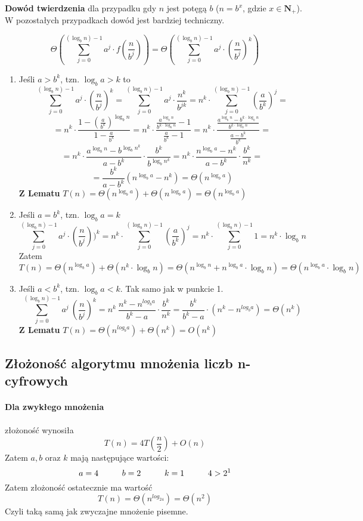 \textbf{Dowód twierdzenia} dla przypadku gdy $n$ jest potęgą $b$ ($n=b^x$, gdzie $x \in \mathbf{N}_+$). W pozostałych przypadkach dowód jest bardziej techniczny.

$$\Theta(\sum_{j=0}^{(\log_b n)-1} a^j \cdot f(\frac{n}{b^j}))=\Theta(\sum_{j=0}^{(\log_b n)-1} a^j\cdot (\frac{n}{b^j})^k)$$

\begin{enumerate}
\item Jeśli $a > b^k$, tzn. $\log_b a > k$ to
	$$ \sum_{j=0}^{(\log_b n)-1} a^j \cdot (\frac{n}{b^j})^k 
	= \sum_{j=0}^{(\log_b n)-1} a^j \cdot \frac{n^k}{b^{jk}}
	= n^k \cdot \sum_{j=0}^{(\log_b n)-1} (\frac{a}{b^k})^j 
	=
	$$
	$$= n^k \cdot \frac{1-(\frac{a}{b^k})^{\log_b n}}{1-\frac{a}{b^k}} 
	= n^k \cdot \frac{\frac{a^{\log_b n}} {b^{k \cdot \log_b n}}-1}{\frac{a}{b^k}-1} 
	= n^k \cdot \frac{\frac{a^{\log_b n} - b^{k \cdot \log_b n}}{b^{k \cdot \log_b n}}}{\frac{a-b^k}{b^k}} 
	=
	$$
	$$
	= n^k \cdot \frac{a^{\log_b n} - b^{\log_b n^k}}{a - b^k} \cdot  \frac{b^k}{b^{\log_b n^k}}
	= n^k \cdot \frac{n^{\log_b a}-n^k}{a - b^k} \cdot \frac{b^k}{n^k} 
	=	
	$$
	$$	
	= \frac{b^k}{a-b^k}(n^{\log_b a}-n^k) 
	= \Theta(n^{\log_b a})$$
	\textbf{Z Lematu} $T(n) = \Theta(n^{\log_b a}) + \Theta(n^{\log_b a}) = \Theta(n^{\log_b a})$
\item Jeśli $a = b^k$, tzn. $\log_b a=k$
	$$	\sum_{j=0}^{(\log_b n)-1} a^j \cdot (\frac{n}{b^j}))^k 
	= n^k \cdot \sum_{j=0}^{(\log_b n)-1} (\frac{a}{b^k})^j 
	= n^k \cdot \sum_{j=0}^{(\log_b n)-1} 1 
	= n^k \cdot \log_b n
	$$
	Zatem 
	$$T(n) = \Theta(n^{\log_b a}) + \Theta(n^k \cdot \log_b n) 
	= \Theta(n^{\log_b n} + n^{\log_b a} \cdot \log_b n) 
	= \Theta(n^{\log_b a} \cdot \log_b n) $$
\item Jeśli $a<b^k$, tzn. $\log_b a<k$. Tak samo jak w punkcie 1.
	$$\sum_{j=0}^{(\log_b n)-1} a^j\ (\frac{n}{b^j})^k = n^k\ \frac{n^k-n^{log_ba}}{b^k-a} \cdot \frac{b^k}{n^k} = \frac{b^k}{b^k-a}\cdot (n^k - n^{log_ba})=\Theta(n^k)$$
	\textbf{Z Lematu} $T(n) = \Theta(n^{log_ba}) + \Theta(n^k) = O(n^k)$
\end{enumerate}

\subsection{Złożoność algorytmu mnożenia liczb n-cyfrowych}
\paragraph{Dla zwykłego mnożenia} złożoność wynosiła
	$$T(n) = 4T(\frac{n}{2}) + O(n)$$
Zatem $a,b$ oraz $k$ mają następujące wartości:
	$$a=4 \hspace*{1cm} b=2 \hspace*{1cm} k=1 \hspace*{1cm} 4>2^1$$
Zatem złożoność ostatecznie ma wartość
	$$T(n) = \Theta(n^{log_24})=\Theta(n^2)$$
Czyli taką samą jak zwyczajne mnożenie pisemne.

